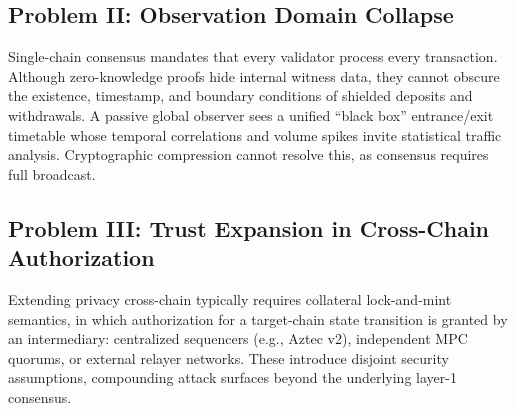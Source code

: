 \documentclass[sigconf,nonacm]{acmart}
\begin{document}
\subsection{Problem II: Observation Domain Collapse}
Single-chain consensus mandates that every validator process every transaction. Although zero-knowledge proofs hide internal witness data, they cannot obscure the existence, timestamp, and boundary conditions of shielded deposits and withdrawals. A passive global observer sees a unified ``black box'' entrance/exit timetable whose temporal correlations and volume spikes invite statistical traffic analysis. Cryptographic compression cannot resolve this, as consensus requires full broadcast.

\subsection{Problem III: Trust Expansion in Cross-Chain Authorization}
Extending privacy cross-chain typically requires collateral lock-and-mint semantics, in which authorization for a target-chain state transition is granted by an intermediary: centralized sequencers (e.g., Aztec v2), independent MPC quorums, or external relayer networks. These introduce disjoint security assumptions, compounding attack surfaces beyond the underlying layer-1 consensus.
\end{document}
